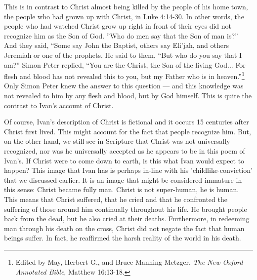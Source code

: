 This is in contrast to Christ almost being killed by the people of his home town, the people who had grown up with Christ, in Luke 4:14-30. In other words, the people who had watched Christ grow up right in front of their eyes did not recognize him as the Son of God. ''Who do men say that the Son of man is?'' And they said, ``Some say John the Baptist, others say Eli'jah, and others Jeremiah or one of the prophets. He said to them, ``But who do you say that I am?'' Simon Peter replied, ``You are the Christ, the Son of the living God... For flesh and blood has not revealed this to you, but my Father who is in heaven.''\footnote{Edited by May, Herbert G., and Bruce Manning Metzger. \emph{The New Oxford Annotated Bible}, Matthew 16:13-18.} Only Simon Peter knew the answer to this question --- and this knowledge was not revealed to him by any flesh and blood, but by God himself. This is quite the contrast to Ivan's account of Christ.

Of course, Ivan's description of Christ is fictional and it occurs 15 centuries after Christ first lived. This might account for the fact that people recognize him. But, on the other hand, we still see in Scripture that Christ was not universally recognized, nor was he universally accepted as he appears to be in this poem of Ivan's. If Christ were to come down to earth, is this what Ivan would expect to happen? This image that Ivan has is perhaps in-line with his 'childlike-conviction' that we discussed earlier. It is an image that might be considered immature in this sense: Christ became fully man. Christ is not super-human, he is human. This means that Christ suffered, that he cried and that he confronted the suffering of those around him continually throughout his life. He brought people back from the dead, but he also cried at their deaths. Furthermore, in redeeming man through his death on the cross, Christ did not negate the fact that human beings suffer. In fact, he reaffirmed the harsh reality of the world in his death.

